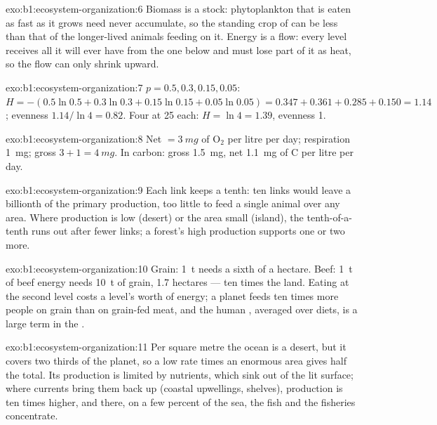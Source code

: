 \begin{solution}{exo:b1:ecosystem-organization:6}
Biomass is a stock: phytoplankton that is eaten as fast as it grows
need never accumulate, so the standing crop of  can be less
than that of the longer-lived animals feeding on it. Energy is a
flow: every level receives all it will ever have from the one below
and must lose part of it as heat, so the flow can only shrink upward.
\end{solution}

\begin{solution}{exo:b1:ecosystem-organization:7}
$p = 0.5, 0.3, 0.15, 0.05$: $H = -(0.5\ln 0.5 + 0.3\ln 0.3 + 0.15\ln
0.15 + 0.05\ln 0.05) = 0.347 + 0.361 + 0.285 + 0.150 = 1.14$;
evenness $1.14/\ln 4 = 0.82$. Four at 25 each: $H = \ln 4 = 1.39$,
evenness 1.
\end{solution}

\begin{solution}{exo:b1:ecosystem-organization:8}
Net $= \qty{3}{mg}$ of $\mathrm{O_2}$ per litre per day; respiration
\qty{1}{mg}; gross $3 + 1 = \qty{4}{mg}$. In carbon: gross
\qty{1.5}{mg}, net \qty{1.1}{mg} of C per litre per day.
\end{solution}

\begin{solution}{exo:b1:ecosystem-organization:9}
Each link keeps a tenth: ten links would leave a billionth of the
primary production, too little to feed a single animal over any area.
Where production is low (desert) or the area small (island), the
tenth-of-a-tenth runs out after fewer links; a forest's high
production supports one or two more.
\end{solution}

\begin{solution}{exo:b1:ecosystem-organization:10}
Grain: \qty{1}{t} needs a sixth of a hectare. Beef: \qty{1}{t} of beef
energy needs \qty{10}{t} of grain, \num{1.7} hectares --- ten times
the land. Eating at the second level costs a level's worth of energy;
a planet feeds ten times more people on grain than on grain-fed meat,
and the human , averaged over diets, is a large term in
the .
\end{solution}

\begin{solution}{exo:b1:ecosystem-organization:11}
Per square metre the ocean is a desert, but it covers two thirds of
the planet, so a low rate times an enormous area gives half the
total. Its production is limited by nutrients, which sink out of the
lit surface; where currents bring them back up (coastal upwellings,
shelves), production is ten times higher, and there, on a few percent
of the sea, the fish and the fisheries concentrate.
\end{solution}

